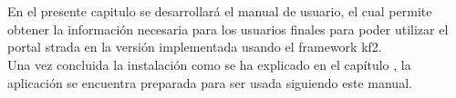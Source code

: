 


\section{}
En el presente capitulo se desarrollará el manual de usuario, el cual permite obtener la información necesaria para los usuarios finales para poder utilizar el portal \gls{strada} en la versión implementada usando el \gls{framework} \gls{kf2}.\\



Una vez concluida la instalación como se ha explicado en el capítulo \label{chapter:install}, la aplicación se encuentra preparada para ser usada siguiendo este manual.
